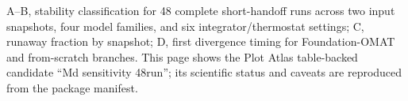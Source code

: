 A--B, stability classification for 48 complete short-handoff runs across two input snapshots, four model families, and six integrator/thermostat settings; C, runaway fraction by snapshot; D, first divergence timing for Foundation-OMAT and from-scratch branches. This page shows the Plot Atlas table-backed candidate ``Md sensitivity 48run''; its scientific status and caveats are reproduced from the package manifest.
